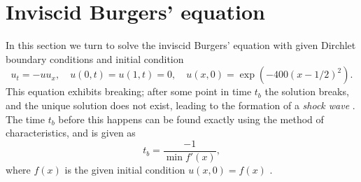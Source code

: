 
%
%    

\newpage
\section{Inviscid Burgers' equation}

In this section we turn to solve the inviscid Burgers' equation with given Dirchlet boundary conditions and initial condition
\begin{equation}
    u_t = -uu_x, \quad u(0, t) = u(1, t) = 0, \quad u(x, 0) = \exp\left(-400(x-1/2)^2\right).
    \label{eq:burger}
\end{equation}
This equation exhibits breaking; 
after some point in time $t_b$ the solution breaks, 
and the unique solution does not exist, 
leading to the formation of a \textit{shock wave} \cite{LeVeque}. 
The time $t_b$ before this happens can be found exactly using the method of characteristics, 
and is given as 
\begin{equation}
    t_b = \frac{-1}{\min f'(x)}, 
    \label{eq:t_break}
\end{equation}
where $f(x)$ is the given initial condition $u(x, 0) = f(x)$ \cite{LeVeque}. 


